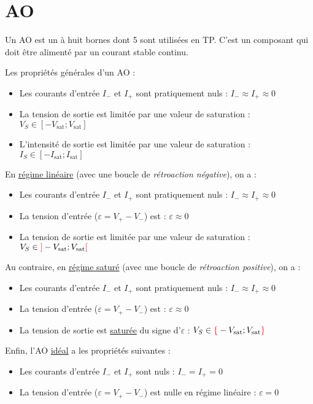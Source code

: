 \documentclass[11pt,a4paper,fleqn,pdftex]{report}
\begin{document}
\section{\acrfull{AO}} %
\label{sec:AO}
\begin{dfn}[L'\acrlong{AO}]
   Un \gls{AO} est un  à huit bornes dont 5 sont utilisées en TP. C'est un composant  qui doit être alimenté par un courant stable continu.
\end{dfn}
\begin{prop}
Les propriétés générales d'un \gls{AO} :
   \begin{itemize}
     \item Les courants d'entrée $I_-$ et $I_+$ sont pratiquement nuls : $I_- \approx I_+ \approx 0$
     \item La tension de sortie est limitée par une valeur de saturation : $V_S \in [-V_\text{sat} ; V_\text{sat}] $
     \item L'intensité de sortie est limitée par une valeur de saturation : $I_S \in [-I_\text{sat} ; I_\text{sat}] $
   \end{itemize}
   \vspace{6mm}
En \uline{régime linéaire} (avec une boucle de \emph{rétroaction négative}), on a : 
   \begin{itemize}
     \item Les courants d'entrée $I_-$ et $I_+$ sont pratiquement nuls : $I_- \approx I_+ \approx 0$
     \item La tension d'entrée ($\varepsilon = V_+ - V_-$) est  : $\varepsilon \approx 0$
     \item La tension de sortie est limitée par une valeur de saturation : $V_S \in \textcolor{couleurImp}{]}-V_\text{sat} ; V_\text{sat}\textcolor{couleurImp}{[} $
   \end{itemize}
   \vspace{6mm}
Au contraire, en \uline{régime saturé} (avec une boucle de \emph{rétroaction positive}), on a : 
   \begin{itemize}
     \item Les courants d'entrée $I_-$ et $I_+$ sont pratiquement nuls : $I_- \approx I_+ \approx 0$
     \item La tension d'entrée ($\varepsilon = V_+ - V_-$) est  : $\varepsilon \approx 0$
     \item La tension de sortie est \uline{saturée} du signe d'$\varepsilon$ : $V_S \in \textcolor{couleurImp}{\lbrace}-V_\text{sat} ; V_\text{sat}\textcolor{couleurImp}{\rbrace} $
   \end{itemize}
   \vspace{6mm}
Enfin, l'\gls{AO} \uline{idéal} a les propriétés suivantes : 
   \begin{itemize}
     \item Les courants d'entrée $I_-$ et $I_+$ sont nuls : $I_- = I_+ = 0$
     \item La tension d'entrée ($\varepsilon = V_+ - V_-$) est nulle en régime linéaire : $\varepsilon = 0$
   \end{itemize}
\end{prop}
\needspace{10cm}
\end{document}

